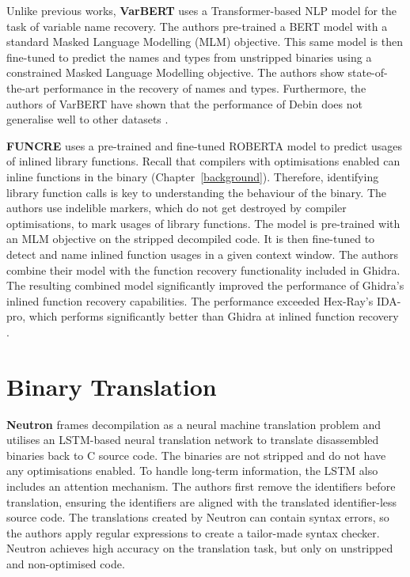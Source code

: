 Unlike previous works, \textbf{VarBERT} \cite{VarBERT} uses a Transformer-based NLP model for the task of variable name recovery. The authors pre-trained a BERT model with a standard Masked Language Modelling (MLM) objective. This same model is then fine-tuned to predict the names and types from unstripped binaries using a constrained Masked Language Modelling objective. The authors show state-of-the-art performance in the recovery of names and types. Furthermore, the authors of VarBERT have shown that the performance of Debin does not generalise well to other datasets \cite{VarBERT}. 

\textbf{FUNCRE} \cite{FUNCRE} uses a pre-trained and fine-tuned ROBERTA model to predict usages of inlined library functions. Recall that compilers with optimisations enabled can inline functions in the binary (Chapter~\ref{background}). Therefore, identifying library function calls is key to understanding the behaviour of the binary. The authors use indelible markers, which do not get destroyed by compiler optimisations, to mark usages of library functions. The model is pre-trained with an MLM objective on the stripped decompiled code. It is then fine-tuned to detect and name inlined function usages in a given context window. The authors combine their model with the function recovery functionality included in Ghidra. The resulting combined model significantly improved the performance of Ghidra's inlined function recovery capabilities. The performance exceeded Hex-Ray's IDA-pro, which performs significantly better than Ghidra at inlined function recovery \cite{FUNCRE}. 

\section{Binary Translation}
\textbf{Neutron} \cite{Neutron} frames decompilation as a neural machine translation problem and utilises an LSTM-based neural translation network to translate disassembled binaries back to C source code. The binaries are not stripped and do not have any optimisations enabled. To handle long-term information, the LSTM also includes an attention mechanism. The authors first remove the identifiers before translation, ensuring the identifiers are aligned with the translated identifier-less source code. The translations created by Neutron can contain syntax errors, so the authors apply regular expressions to create a tailor-made syntax checker. Neutron achieves high accuracy on the translation task, but only on unstripped and non-optimised code.

